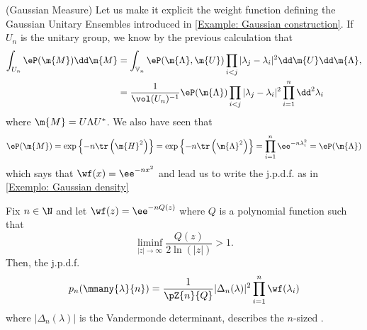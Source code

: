 \begin{exemplo} (Gaussian Measure)
	Let us make it explicit the weight function defining the Gaussian Unitary Ensembles introduced in \autoref{Example: Gaussian construction}.  If $U_n$ is the unitary group, we know by the previous calculation that
	\begin{align}
		\int_{U_n} \eP(\m{M}) \dd \m{M} & = \int_{\mathbb{V}_n} \eP(\m{\Lambda}, \m{U}) \prod_{i<j} |\lambda_j - \lambda_i|^2 \dd \m{U} \dd \m{\Lambda}, \\
		& = \frac{1}{\vol(U_n)^{-1}} \eP(\m{\Lambda}) \prod_{i<j} |\lambda_j - \lambda_i|^2 \prod_{i=1}^{n} \dd^2 \lambda_i
	\end{align}
	where $\m{M} = U \Lambda U^*$. We also have seen that 
	\begin{equation}
		\eP(\m{M}) = \exp\left\{- n \tr\left( \m{H}^2 \right)\right\}
		= \exp\left\{- n \tr\left(\m{\Lambda}^2 \right)\right\} 
		= \prod_{i=1}^{n} \ee^{- n \lambda_i^2} 
		=  \eP(\m{\Lambda})
	\end{equation}
	which says that $\wf(x) = \ee^{- n x^2}$ and lead us to write the j.p.d.f. as in \autoref{Exemplo: Gaussian density}
\end{exemplo}

\begin{definicao}	\label{Definition: polynomial ensemble}
	Fix $n \in \N$ and let $\wf(z) =  \ee^{-n Q(z)}$  where $Q$ is a polynomial function such that 
	\begin{equation}
		\liminf_{|z| \rightarrow \infty } \frac{Q(z)}{2 \ln{(|z|)}} > 1.
	\end{equation}
	Then, the j.p.d.f.
	\begin{equation}
		p_n(\mmany{\lambda}{n}) = \frac{1}{\pZ{n}{Q}} |\Delta_n(\lambda)|^2  \prod_{i=1}^{n} \wf(\lambda_i)
		\label{Equation: orthogonal polynomial ensemble}
	\end{equation}
	where $|\Delta_n(\lambda)|$ is the Vandermonde determinant, describes the $n$-sized .
\end{definicao}


